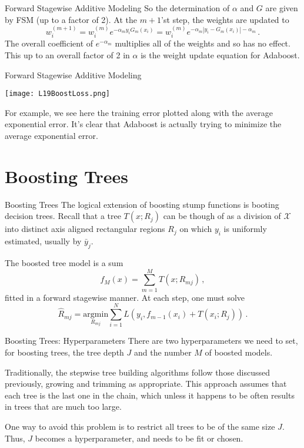 \documentclass[10pt, table, dvipsnames,xcdraw, handout]{beamer}
\newcommand{\cX}{\ensuremath{\mathcal{X}}}
\begin{document}
\begin{frame}[fragile]{Forward Stagewise Additive Modeling}
So the determination of $\alpha$ and $G$ are given by FSM (up to a factor of 2). At the $m+1$'st step, the weights are updated to 
$$
w_i^{(m+1)} = w_i^{(m)} e^{-\alpha_my_iG_m(x_i)} = w_i^{(m)} e^{-\alpha_m|y_i-G_m(x_i)| - \alpha_m}\,.
$$\pause
The overall coefficient of $e^{-\alpha_m}$ multiplies all of the weights and so has no effect. This up to an overall factor of 2 in $\alpha$ is  the weight update equation for Adaboost.  \pause
\end{frame}




\begin{frame}[fragile]{Forward Stagewise Additive Modeling}
  \begin{minipage}[t][0.5\textheight][t]{\textwidth}
	\centering \texttt{[image: L19BoostLoss.png]} 
  \end{minipage}
  \vfill
\begin{minipage}[t][0.5\textheight][t]{\textwidth}
For example, we see here the training error plotted along with the average exponential error. It's clear that Adaboost is actually trying to minimize the average exponential error. 
\end{minipage}
\end{frame}







\section{Boosting Trees}
 
 \begin{frame}[fragile]{Boosting Trees}
The logical extension of boosting stump functions is booting decision trees. Recall that a tree $T(x;R_j)$ can be though of as a division of $\cX$ into distinct axis aligned rectangular regions $R_j$ on which $y_i$ is uniformly estimated, usually by $\bar y_{j}$. \pause 

The boosted tree model is a sum 
$$
f_M(x) = \sum_{m=1}^M T(x;R_{mj})\,,
$$
fitted in a forward stagewise manner. \pause At each step, one must solve
$$
\hat R_{mj} = \underset{R_{mj}}{\text{argmin}}\sum_{i=1}^N L(y_i, f_{m-1}(x_i) + T(x_i;R_{j}))\,.
$$
\end{frame}


 \begin{frame}[fragile]{Boosting Trees: Hyperparameters}
There are two hyperparameters we need to set, for boosting trees, the tree depth $J$ and the number $M$ of boosted models. \pause

Traditionally, the stepwise tree building algorithms follow those discussed previously, growing and trimming as appropriate. This approach assumes that each tree is the last one in the chain, which unless it happens to be often results in trees that are much too large. \pause

One way to avoid this problem is to restrict all trees to be of the same size $J$. Thus, $J$ becomes a hyperparameter, and needs to be fit or chosen. 
\end{frame}
\end{document}
